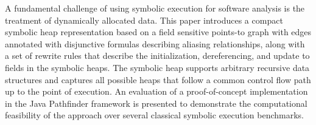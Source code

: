 
A fundamental challenge of using symbolic execution for software
analysis is the treatment of dynamically allocated data.  This paper
introduces a compact symbolic heap representation based on a field
sensitive points-to graph with edges annotated with disjunctive
formulas describing aliasing relationships, along with a set of
rewrite rules that describe the initialization, dereferencing, and
update to fields in the symbolic heaps. The symbolic heap supports
arbitrary recursive data structures and captures all possible heaps
that follow a common control flow path up to the point of
execution. An evaluation of a proof-of-concept implementation in the
Java Pathfinder framework is presented to demonstrate the
computational feasibility of the approach over several classical
symbolic execution benchmarks.



